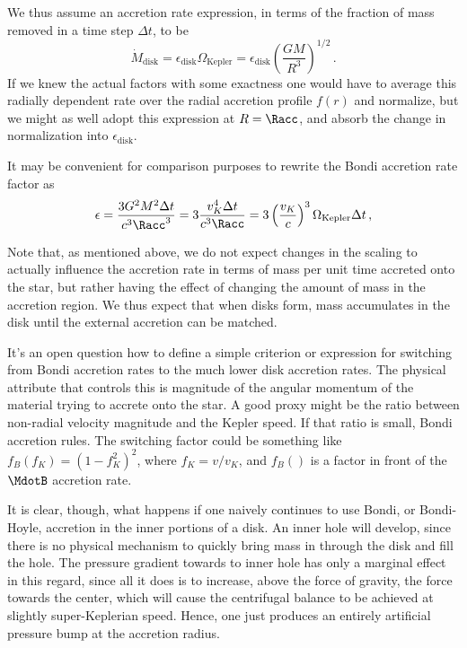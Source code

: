 \documentclass[paper=a4,fontsize=11pt]{scrartcl}
\numberwithin{equation}{section}		%
\numberwithin{figure}{section}			%
\numberwithin{table}{section}				%
\begin{document}
We thus assume an accretion rate expression, in terms of the fraction of mass removed in a time step $\Delta t$, to be
\def\Mdotdisk{\dot{M}_\mathrm{disk}}
\def\OmK{\Omega_\mathrm{Kepler}}
\def\epsdisk{\epsilon_\mathrm{disk}}
\begin{equation}
    \Mdotdisk = \epsdisk \OmK = \epsdisk \left( \frac{G M}{R^3}\right)^{1/2} \,.
\end{equation}
If we knew the actual factors with some exactness one would have to average this radially dependent rate over the radial accretion profile $f(r)$ and normalize, but we might as well adopt this expression at $R=\Racc$, and absorb the change in normalization into $\epsdisk$.

It may be convenient for comparison purposes to rewrite the Bondi accretion rate factor as
\begin{equation}
    \epsilon = \frac{3 G^2 M^2 \Delta t}{c^3 \Racc^3}
    = 3 \frac{v_K^4 \Delta t}{c^3 \Racc} 
    = 3 \left(\frac{v_K}{c}\right)^3 \OmK \Delta t\,,
\end{equation}

Note that, as mentioned above, we do not expect changes in the scaling to actually influence the accretion rate in terms of mass per unit time accreted onto the star, but rather having the effect of changing the amount of mass in the accretion region.  We thus expect that when disks form, mass accumulates in the disk until the external accretion can be matched.

It's an open question how to define a simple criterion or expression for switching from Bondi accretion rates to the much lower disk accretion rates.  The physical attribute that controls this is magnitude of the angular momentum of the material trying to accrete onto the star.  A good proxy might be the ratio between non-radial velocity magnitude and the Kepler speed.  If that ratio is small, Bondi accretion rules.   The switching factor could be something like $f_B(f_K)=(1-f_K^2)^2$, where $f_K=v/v_K$, and $f_B()$ is a factor in front of the $\MdotB$ accretion rate.

It is clear, though, what happens if one naively continues to use Bondi, or Bondi-Hoyle, accretion in the inner portions of a disk.  An inner hole will develop, since there is no physical mechanism to quickly bring mass in through the disk and fill the hole.  The pressure gradient towards to inner hole has only a marginal effect in this regard, since all it does is to increase, above the force of gravity, the force towards the center, which will cause the centrifugal balance to be achieved at slightly super-Keplerian speed.  Hence, one just produces an entirely artificial pressure bump at the accretion radius.
\end{document}
